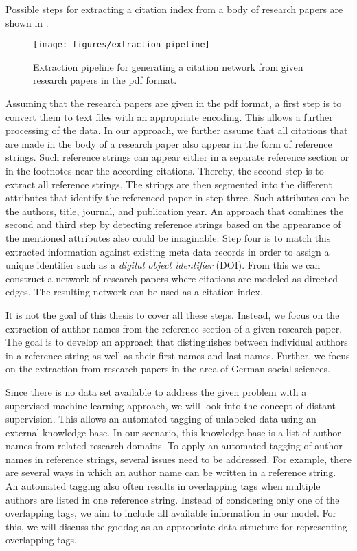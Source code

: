 Possible steps for extracting a citation index from a body of research papers are shown in .
\begin{figure}[t]
\texttt{[image: figures/extraction-pipeline]}
\caption{Extraction pipeline for generating a citation network from given research papers in the \gls{pdf} format.}
\label{fig:extraction-pipeline}
\end{figure}
Assuming that the research papers are given in the \gls{pdf} format, a first step is to convert them to text files with an appropriate encoding.
This allows a further processing of the data.
In our approach, we further assume that all citations that are made in the body of a research paper also appear in the form of reference strings.
Such reference strings can appear either in a separate reference section or in the footnotes near the according citations.
Thereby, the second step is to extract all reference strings.
The strings are then segmented into the different attributes that identify the referenced paper in step three.
Such attributes can be the authors, title, journal, and publication year.
An approach that combines the second and third step by detecting reference strings based on the appearance of the mentioned attributes also could be imaginable.
Step four is to match this extracted information against existing meta data records in order to assign a unique identifier such as a \textit{digital object identifier} (DOI).
From this we can construct a network of research papers where citations are modeled as directed edges.
The resulting network can be used as a citation index.

It is not the goal of this thesis to cover all these steps.
Instead, we focus on the extraction of author names from the reference section of a given research paper.
The goal is to develop an approach that distinguishes between individual authors in a reference string as well as their first names and last names.
Further, we focus on the extraction from research papers in the area of German social sciences.

\bigskip

Since there is no data set available to address the given problem with a supervised machine learning approach, we will look into the concept of \gls{distant supervision}.
This allows an automated tagging of unlabeled data using an external knowledge base.
In our scenario, this knowledge base is a list of author names from related research domains.
To apply an automated tagging of author names in reference strings, several issues need to be addressed.
For example, there are several ways in which an author name can be written in a reference string.
An automated tagging also often results in overlapping tags when multiple authors are listed in one reference string.
Instead of considering only one of the overlapping tags, we aim to include all available information in our model.
For this, we will discuss the \gls{goddag} as an appropriate data structure for representing overlapping tags.

